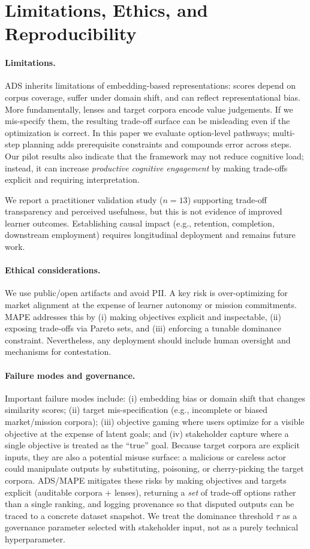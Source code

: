 \documentclass[sigconf,review]{acmart}
\newcommand{\ADS}{\textsc{ADS}\xspace}
\newcommand{\MAPE}{\textsc{MAPE}\xspace}
\begin{document}
\section{Limitations, Ethics, and Reproducibility}
\label{sec:ethics}
\paragraph{Limitations.}
\ADS inherits limitations of embedding-based representations: scores depend on corpus coverage, suffer under domain shift, and can reflect representational bias. More fundamentally, lenses and target corpora encode value judgements. If we mis-specify them, the resulting trade-off surface can be misleading even if the optimization is correct. In this paper we evaluate option-level pathways; multi-step planning adds prerequisite constraints and compounds error across steps. Our pilot results also indicate that the framework may not reduce cognitive load; instead, it can increase \emph{productive cognitive engagement} by making trade-offs explicit and requiring interpretation.

We report a practitioner validation study ($n{=}13$) supporting trade-off transparency and perceived usefulness, but this is not evidence of improved learner outcomes. Establishing causal impact (e.g., retention, completion, downstream employment) requires longitudinal deployment and remains future work.

\paragraph{Ethical considerations.}
We use public/open artifacts and avoid PII. A key risk is over-optimizing for market alignment at the expense of learner autonomy or mission commitments. \MAPE addresses this by (i) making objectives explicit and inspectable, (ii) exposing trade-offs via Pareto sets, and (iii) enforcing a tunable dominance constraint. Nevertheless, any deployment should include human oversight and mechanisms for contestation.

\paragraph{Failure modes and governance.}
Important failure modes include: (i) {embedding bias} or domain shift that changes similarity scores; (ii) {target mis-specification} (e.g., incomplete or biased market/mission corpora); (iii) {objective gaming} where users optimize for a visible objective at the expense of latent goals; and (iv) {stakeholder capture} where a single objective is treated as the ``true'' goal. Because target corpora are explicit inputs, they are also a potential misuse surface: a malicious or careless actor could manipulate outputs by substituting, poisoning, or cherry-picking the target corpora. \ADS/\MAPE mitigates these risks by making objectives and targets explicit (auditable corpora + lenses), returning a \emph{set} of trade-off options rather than a single ranking, and logging provenance so that disputed outputs can be traced to a concrete dataset snapshot. We treat the dominance threshold $\tau$ as a governance parameter selected with stakeholder input, not as a purely technical hyperparameter.
\end{document}
